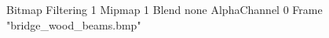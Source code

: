 {Bitmap
	{Filtering 1}
	{Mipmap 1}
	{Blend none}
	{AlphaChannel 0}
	{Frame "bridge_wood_beams.bmp"}
}

